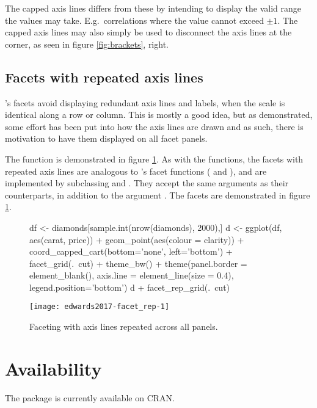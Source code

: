 The capped axis lines differs from these by intending to display the
valid range the values may take. E.g.~correlations where the value
cannot exceed \(\pm 1\). The capped axis lines may also simply be used
to disconnect the axis lines at the corner, as seen in figure
\ref{fig:brackets}, right.

\subsection{Facets with repeated axis lines}

's facets avoid displaying redundant axis lines and
labels, when the scale is identical along a row or column. This is
mostly a good idea, but as demonstrated, some effort has been put into
how the axis lines are drawn and as such, there is motivation to have
them displayed on all facet panels.

The function  is demonstrated in figure
\ref{fig:facet_rep}. As with the  functions, the
facets with repeated axis lines are analogous to 's
facet functions ( and ), and are
implemented by subclassing  and . They
accept the same arguments as their  counterparts, in
addition to the argument . The facets are
demonstrated in figure \ref{fig:facet_rep}.

\begin{figure}[h!]

\begin{Sinput}
df <- diamonds[sample.int(nrow(diamonds), 2000),]
d <- ggplot(df, aes(carat, price)) +
  geom_point(aes(colour = clarity)) + 
  coord_capped_cart(bottom='none', left='bottom') +
  facet_grid(.~cut) + theme_bw() + 
  theme(panel.border = element_blank(), axis.line = element_line(size = 0.4),
        legend.position='bottom')
d + facet_rep_grid(.~cut)
\end{Sinput}

\texttt{[image: edwards2017-facet\_rep-1]} 
  \caption{Faceting with axis lines repeated across all panels.}
  \label{fig:facet_rep}
\end{figure}

\section{Availability}

The  package is currently available on CRAN.

